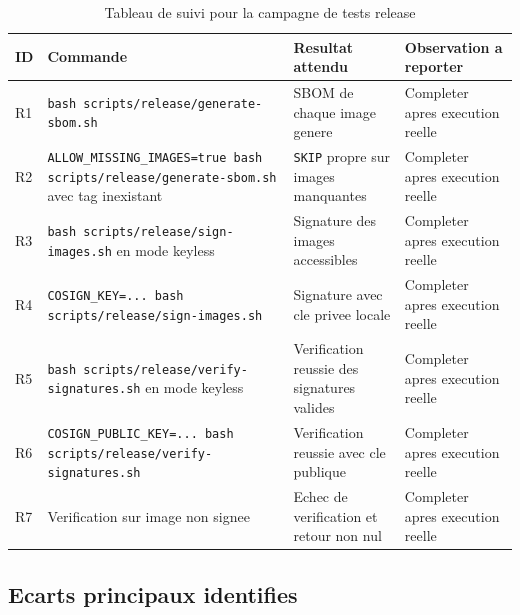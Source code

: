 \begin{table}[h]
\centering
\begin{tabular}{|p{1.2cm}|p{4.0cm}|p{4.2cm}|p{4.0cm}|}
\hline
\textbf{ID} & \textbf{Commande} & \textbf{Resultat attendu} & \textbf{Observation a reporter} \\
\hline
R1 & \texttt{bash scripts/release/generate-sbom.sh} & SBOM de chaque image genere & Completer apres execution reelle \\
\hline
R2 & \texttt{ALLOW\_MISSING\_IMAGES=true bash scripts/release/generate-sbom.sh} avec tag inexistant & \texttt{SKIP} propre sur images manquantes & Completer apres execution reelle \\
\hline
R3 & \texttt{bash scripts/release/sign-images.sh} en mode keyless & Signature des images accessibles & Completer apres execution reelle \\
\hline
R4 & \texttt{COSIGN\_KEY=... bash scripts/release/sign-images.sh} & Signature avec cle privee locale & Completer apres execution reelle \\
\hline
R5 & \texttt{bash scripts/release/verify-signatures.sh} en mode keyless & Verification reussie des signatures valides & Completer apres execution reelle \\
\hline
R6 & \texttt{COSIGN\_PUBLIC\_KEY=... bash scripts/release/verify-signatures.sh} & Verification reussie avec cle publique & Completer apres execution reelle \\
\hline
R7 & Verification sur image non signee & Echec de verification et retour non nul & Completer apres execution reelle \\
\hline
\end{tabular}
\caption{Tableau de suivi pour la campagne de tests release}
\end{table}

\subsection{Ecarts principaux identifies}

